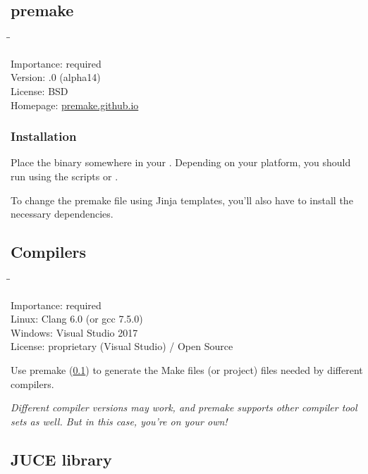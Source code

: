 \subsection{premake}
\label{sec:dependencies_premake}

\begin{tabbing}
  \hspace*{6em}\=\=\kill

  Importance:  \> required \\
  Version:     .0 (alpha14) \\
  License:     \> BSD \\
  Homepage:    \> \href{https://premake.github.io/}{premake.github.io}
\end{tabbing}

\subsubsection{Installation}

Place the binary somewhere in your .  Depending on your
platform, you should run  using the scripts
 or .

To change the premake file using Jinja templates, you'll also have to
install the necessary dependencies.

\subsection{Compilers}

\begin{tabbing}
  \hspace*{6em}\=\=\kill

  Importance:  \> required \\
  Linux:       \> Clang 6.0 (or gcc 7.5.0) \\
  Windows:     \> Visual Studio 2017 \\
  License:     \> proprietary (Visual Studio) / Open Source \\
\end{tabbing}

Use premake (\ref{sec:dependencies_premake}) to generate the Make
files (or project) files needed by different compilers.

\emph{Different compiler versions may work, and premake supports other
  compiler tool sets as well.  But in this case, you're on your own!}

\subsection{JUCE library}

